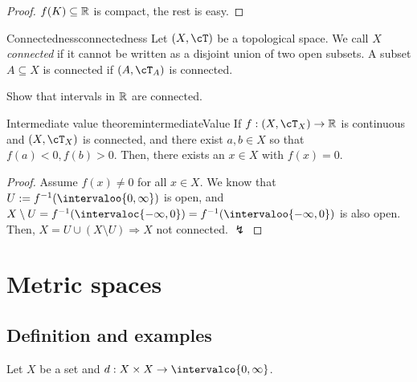 \documentclass[language=english]{../../Template/TemplateLecture}
\begin{document}
\begin{proof}
    $f(K) \subseteq \mathbb{R}$ is compact, the rest is easy.
\end{proof}

\begin{defi}{Connectedness}{connectedness}
    Let $(X, \cT)$ be a topological space. We call $X$ \emph{connected} if it cannot be written as a disjoint union of two open subsets. A subset $A \subseteq X$ is connected if $(A, \cT_A)$ is connected.
\end{defi}

\begin{aufgabe}
    Show that intervals in $\mathbb{R}$ are connected.
\end{aufgabe}

\begin{thm}{Intermediate value theorem}{intermediateValue}
    If $f: (X, \cT_X) \to \IR$ is continuous and $(X, \cT_X)$ is connected, and there exist $a, b \in X$ so that $f(a) < 0, f(b) > 0$. Then, there exists an $x \in X$ with $f(x) = 0$.
\end{thm}

\begin{proof}
    Assume $f(x) \neq 0$ for all $x \in X$. We know that $U := f^{-1}(\intervaloo{0,\infty})$ is open, and $X \setminus U = f^{-1}(\intervaloc{-\infty,0}) = f^{-1}(\intervaloo{-\infty,0})$ is also open. Then, $X = U \cup (X \setminus U) \Rightarrow X$ not connected. $\lightning$
\end{proof}

\section{Metric spaces}
\subsection{Definition and examples}

Let $X$ be a set and $d: X \times X \to \intervalco{0,\infty}$.
\end{document}

